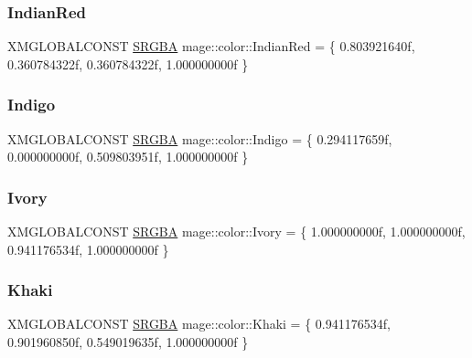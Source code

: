 \hypertarget{namespacemage_1_1color_ae55d6dafecdd3658cc65030c36378ce6}{}\label{namespacemage_1_1color_ae55d6dafecdd3658cc65030c36378ce6} 
\subsubsection{\texorpdfstring{Indian\+Red}{IndianRed}}
{\footnotesize\ttfamily X\+M\+G\+L\+O\+B\+A\+L\+C\+O\+N\+ST \hyperlink{structmage_1_1_s_r_g_b_a}{S\+R\+G\+BA} mage\+::color\+::\+Indian\+Red = \{ 0.\+803921640f, 0.\+360784322f, 0.\+360784322f, 1.\+000000000f \}}

\hypertarget{namespacemage_1_1color_a9d61e8b1a66949fcc413c1234094ac66}{}\label{namespacemage_1_1color_a9d61e8b1a66949fcc413c1234094ac66} 
\subsubsection{\texorpdfstring{Indigo}{Indigo}}
{\footnotesize\ttfamily X\+M\+G\+L\+O\+B\+A\+L\+C\+O\+N\+ST \hyperlink{structmage_1_1_s_r_g_b_a}{S\+R\+G\+BA} mage\+::color\+::\+Indigo = \{ 0.\+294117659f, 0.\+000000000f, 0.\+509803951f, 1.\+000000000f \}}

\hypertarget{namespacemage_1_1color_a98e545acecca320d52ee5d84aa915945}{}\label{namespacemage_1_1color_a98e545acecca320d52ee5d84aa915945} 
\subsubsection{\texorpdfstring{Ivory}{Ivory}}
{\footnotesize\ttfamily X\+M\+G\+L\+O\+B\+A\+L\+C\+O\+N\+ST \hyperlink{structmage_1_1_s_r_g_b_a}{S\+R\+G\+BA} mage\+::color\+::\+Ivory = \{ 1.\+000000000f, 1.\+000000000f, 0.\+941176534f, 1.\+000000000f \}}

\hypertarget{namespacemage_1_1color_a8c155ae2fa38902ee22618992b09506d}{}\label{namespacemage_1_1color_a8c155ae2fa38902ee22618992b09506d} 
\subsubsection{\texorpdfstring{Khaki}{Khaki}}
{\footnotesize\ttfamily X\+M\+G\+L\+O\+B\+A\+L\+C\+O\+N\+ST \hyperlink{structmage_1_1_s_r_g_b_a}{S\+R\+G\+BA} mage\+::color\+::\+Khaki = \{ 0.\+941176534f, 0.\+901960850f, 0.\+549019635f, 1.\+000000000f \}}


